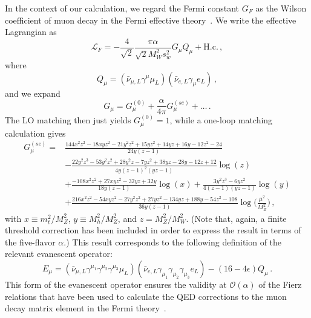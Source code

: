 \documentclass[letter,11pt,DIV=12,abstract=true,numbers=noenddot,titlepage=false,twocolumn=false,draft=false]{scrartcl}
\begin{document}
In the context of our calculation, we regard the Fermi constant $G_F$
as the Wilson coefficient of muon decay in the Fermi effective
theory~\cite{vanRitbergen:1999fi}. We write the effective Lagrangian
as
\begin{equation}
  {\mathcal L}_F
= - \frac{4}{\sqrt{2}} \frac{\pi\alpha}{\sqrt{2}M_W^2 s_w^2} G_\mu Q_\mu + \text{H.c.} \,,
\end{equation}
where
\begin{equation}
  Q_\mu = (\bar\nu_{\mu,L} \gamma^\mu \mu_L)
         (\bar\nu_{e,L} \gamma_\mu e_L) \,,
\end{equation}
and we expand
\begin{equation}
  G_\mu = G_\mu^{(0)} + \frac{\alpha}{4\pi} G_\mu^{(se)} + \ldots \,.
\end{equation}
The LO matching then just yields $G_\mu^{(0)} = 1$, while a one-loop
matching calculation gives
\begin{equation}\begin{split}\label{eq:Gmu:1loop}
 G^{(se)}_\mu =&
 \frac{144 x^2 z^2 - 18 x y z^2 - 21 y^2 z^2 + 15 y z^2 + 14 y z + 16 y
       - 12 z^2 - 24}{24 y (z-1)}\\
 & - \frac{22 y^2 z^3 - 53 y^2 z^2 + 28 y^2 z - 7 y z^2 + 38 y z - 28 y
          - 12 z + 12}{4 y (z-1)^2 (y z-1)} \log(z)\\
 & + \frac{ - 108 x^2 z^2 + 27 x y z^2 - 32 y z + 32 y}{18 y (z - 1)} \log(x)
 + \frac{3 y^2 z^3 - 6 y z^2}{4 (z-1) (y z-1)} \log(y)\\
 & + \frac{216 x^2 z^2 - 54 x y z^2 - 27 y^2 z^2 + 27 y z^2 - 134 y z + 
         188 y - 54 z^2 - 108}{36 y (z - 1)} \log\Big(\frac{\mu^2}{M_Z^2}\Big)\,,
\end{split}\end{equation}
with $x \equiv m_t^2/M_Z^2$, $y \equiv M_h^2/M_Z^2$, and $z =
M_Z^2/M_W^2$. (Note that, again, a finite threshold correction has
been included in order to express the result in terms of the
five-flavor $\alpha$.) This result corresponds to the following
definition of the relevant evanescent operator:
\begin{equation}
  E_\mu = (\bar\nu_{\mu,L} \gamma^{\mu_1} \gamma^{\mu_2} \gamma^{\mu_3} \mu_L)
         (\bar\nu_{e,L} \gamma_{\mu_1} \gamma_{\mu_2} \gamma_{\mu_3} e_L)
         - (16 - 4\epsilon) Q_\mu \,.
\end{equation}
This form of the evanescent operator ensures the validity at
${\mathcal O}(\alpha)$ of the Fierz relations that have been used to
calculate the QED corrections to the muon decay matrix element in the
Fermi theory~\cite{vanRitbergen:1999fi}.
\end{document}
